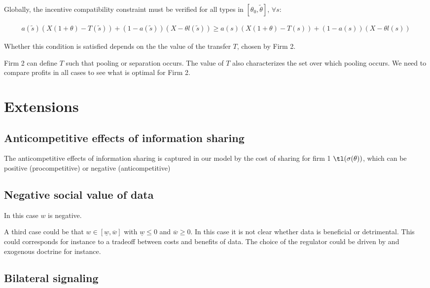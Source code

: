 \documentclass[a4paper]{article}
\renewcommand{\t}{\theta}
\newcommand{\s}{\sigma}
\begin{document}
  
Globally, the incentive compatibility constraint must be verified for all types in $[\t_0, \tilde{\t}]$, $\forall s$:

  \begin{align*}
    a(\tilde{s})(X(1+\t)-T(\tilde{s}))+(1-a(\tilde{s}))(X-\t l(\tilde{s}))\geq a(s)(X(1+\t)-T(s))+(1-a(s))(X-\t l(s))
  \end{align*}


Whether this condition is satisfied depends on the the value of the transfer $T$, chosen by Firm 2.

Firm 2 can define $T$ such that pooling or separation occurs. The value of $T$ also characterizes the set over which pooling occurs. We need to compare profits in all cases to see what is optimal for Firm 2.






\section{Extensions}


\subsection{Anticompetitive effects of information sharing}

The anticompetitive effects of information sharing is captured in our model by the cost of sharing for firm 1 $\tl(\s(\t))$, which can be positive (procompetitive) or negative (anticompetitive)


\subsection{Negative social value of data}

In this case $w$ is negative.

A third case could be that $w\in[\underline{w},\overline{w}]$ with $\underline{w}\leq 0$ and $\overline{w}\geq 0$. In this case it is not clear whether data is beneficial or detrimental. This could corresponds for instance to a tradeoff between costs and benefits of data. The choice of the regulator could be driven by and exogenous doctrine for instance.



\subsection{Bilateral signaling}





\end{document}

